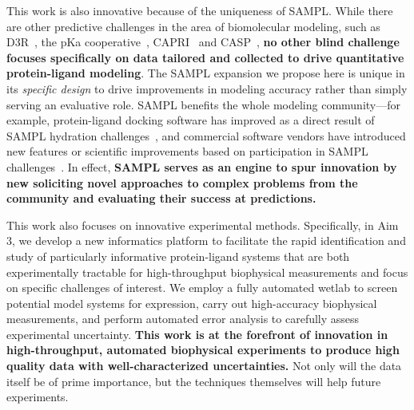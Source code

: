 \documentclass[11pt]{article}
\begin{document}
This work is also innovative because of the uniqueness of SAMPL.
While there are other predictive challenges in the area of biomolecular modeling, such as D3R~\cite{gathiaka_d3r_2016}, the pKa cooperative~\cite{Nielsen:2011:Proteins}, CAPRI~\cite{Janin:2005:ProteinScience} and CASP~\cite{Moult:2014:Proteins},
\textbf{no other blind challenge focuses specifically on data tailored and collected to drive quantitative protein-ligand modeling}.
The SAMPL expansion we propose here is unique in its \emph{specific design} to drive improvements in modeling accuracy rather than simply serving an evaluative role.
SAMPL benefits the whole modeling community---for example, protein-ligand docking software has improved as a direct result of SAMPL hydration challenges~\cite{coleman_sampl4_2014}, and commercial software vendors have introduced new features or scientific improvements based on participation in SAMPL challenges~\cite{reinisch_prediction_2012, klamt_prediction_2016}.
In effect, {\bf SAMPL serves as an engine to spur innovation by new soliciting novel approaches to complex problems from the community and evaluating their success at predictions.}
 

This work also focuses on innovative experimental methods.
Specifically, in Aim 3, we develop a new informatics platform to facilitate the rapid identification and study of particularly informative protein-ligand systems that are both experimentally tractable for high-throughput biophysical measurements and focus on specific challenges of interest.
We employ a fully automated wetlab to screen potential model systems for expression, carry out high-accuracy biophysical measurements, and perform automated error analysis to carefully assess experimental uncertainty.
\textbf{This work is at the forefront of innovation in high-throughput, automated biophysical experiments to produce high quality data with well-characterized uncertainties.} 
Not only will the data itself be of prime importance, but the techniques themselves will help future experiments.
\end{document}
